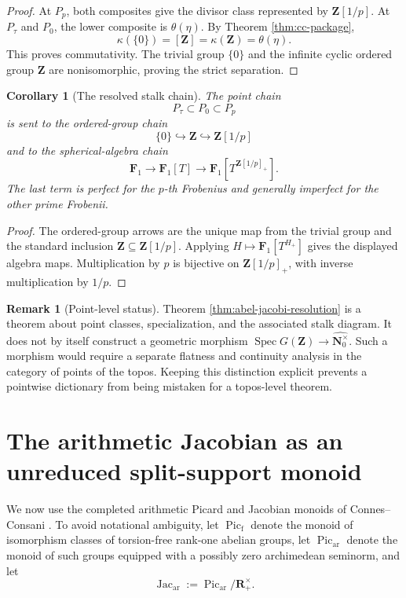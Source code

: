 \documentclass[11pt]{amsart}
\numberwithin{equation}{section}
\newtheorem{corollary}[theorem]{Corollary}
\theoremstyle{definition}
\newtheorem{remark}[theorem]{Remark}
\newcommand{\Z}{\mathbf Z}
\newcommand{\R}{\mathbf R}
\newcommand{\N}{\mathbf N}
\newcommand{\Fone}{\mathbf F_1}
\newcommand{\Spec}{\operatorname{Spec}}
\newcommand{\Picf}{\operatorname{Pic}_{\mathrm f}}
\newcommand{\Picar}{\operatorname{Pic}_{\mathrm{ar}}}
\newcommand{\Jacar}{\operatorname{Jac}_{\mathrm{ar}}}
\begin{document}
\begin{proof}
At $P_p$, both composites give the divisor class represented by
$\Z[1/p]$.  At $P_\tau$ and $P_0$, the lower composite is $\theta(\eta)$.
By Theorem \ref{thm:cc-package},
\[
\kappa(\{0\})=[\Z]=\kappa(\Z)=\theta(\eta).
\]
This proves commutativity.  The trivial group $\{0\}$ and the infinite
cyclic ordered group $\Z$ are nonisomorphic, proving the strict
separation.
\end{proof}

\begin{corollary}[The resolved stalk chain]
\label{cor:resolved-stalk-chain}
The point chain
\[
P_\tau\subset P_0\subset P_p
\]
is sent to the ordered-group chain
\[
\{0\}\hookrightarrow\Z\hookrightarrow\Z[1/p]
\]
and to the spherical-algebra chain
\[
\Fone
\longrightarrow
\Fone[T]
\longrightarrow
\Fone[T^{\Z[1/p]_+}].
\]
The last term is perfect for the $p$-th Frobenius and generally imperfect
for the other prime Frobenii.
\end{corollary}

\begin{proof}
The ordered-group arrows are the unique map from the trivial group and the
standard inclusion $\Z\subseteq\Z[1/p]$.  Applying
$H\mapsto\Fone[T^{H_+}]$ gives the displayed algebra maps.  Multiplication
by $p$ is bijective on $\Z[1/p]_+$, with inverse multiplication by $1/p$.
\end{proof}

\begin{remark}[Point-level status]
Theorem \ref{thm:abel-jacobi-resolution} is a theorem about point classes,
specialization, and the associated stalk diagram.  It does not by itself
construct a geometric morphism
$\Spec G(\Z)\to\widehat{\N_0^\times}$.  Such a morphism would require a
separate flatness and continuity analysis in the category of points of the
topos.  Keeping this distinction explicit prevents a pointwise dictionary
from being mistaken for a topos-level theorem.
\end{remark}


\section{The arithmetic Jacobian as an unreduced split-support monoid}
\label{sec:arithmetic-jacobian-split}

We now use the completed arithmetic Picard and Jacobian monoids of
Connes--Consani \cite{CCJacobian}.  To avoid notational ambiguity, let
$\Picf$ denote the monoid of isomorphism classes of torsion-free rank-one
abelian groups, let $\Picar$ denote the monoid of such groups equipped with
a possibly zero archimedean seminorm, and let
\[
\Jacar:=\Picar/\R_+^\times.
\]
\end{document}
